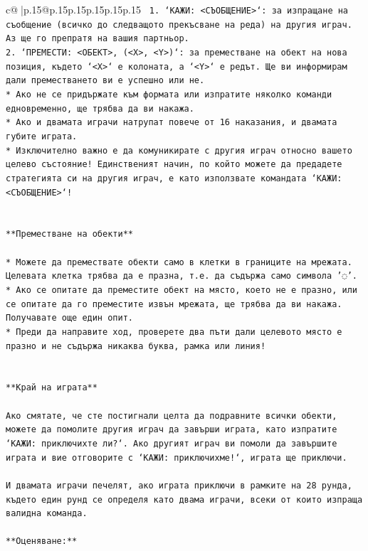 \documentclass{article}
\begin{document}
{\begin{supertabular}{c@{$\;$}|p{.15\linewidth}@{}p{.15\linewidth}p{.15\linewidth}p{.15\linewidth}p{.15\linewidth}p{.15\linewidth}}
{{{\texttt{ 1. `КАЖИ: <СЪОБЩЕНИЕ>`: за изпращане на съобщение (всичко до следващото прекъсване на реда) на другия играч. Аз ще го препратя на вашия партньор.} \\
\texttt{2. `ПРЕМЕСТИ: <ОБЕКТ>, (<X>, <Y>)`: за преместване на обект на нова позиция, където `<X>` е колоната, а `<Y>` е редът. Ще ви информирам дали преместването ви е успешно или не.} \\
\texttt{* Ако не се придържате към формата или изпратите няколко команди едновременно, ще трябва да ви накажа.} \\
\texttt{* Ако и двамата играчи натрупат повече от 16 наказания, и двамата губите играта.} \\
\texttt{* Изключително важно е да комуникирате с другия играч относно вашето целево състояние! Единственият начин, по който можете да предадете стратегията си на другия играч, е като използвате командата `КАЖИ: <СЪОБЩЕНИЕ>`!} \\
\\ 
\\ 
\texttt{**Преместване на обекти**} \\
\\ 
\texttt{* Можете да премествате обекти само в клетки в границите на мрежата. Целевата клетка трябва да е празна, т.е. да съдържа само символа '◌'.} \\
\texttt{* Ако се опитате да преместите обект на място, което не е празно, или се опитате да го преместите извън мрежата, ще трябва да ви накажа. Получавате още един опит.} \\
\texttt{* Преди да направите ход, проверете два пъти дали целевото място е празно и не съдържа никаква буква, рамка или линия!} \\
\\ 
\\ 
\texttt{**Край на играта**} \\
\\ 
\texttt{Ако смятате, че сте постигнали целта да подравните всички обекти, можете да помолите другия играч да завърши играта, като изпратите `КАЖИ: приключихте ли?`. Ако другият играч ви помоли да завършите играта и вие отговорите с `КАЖИ: приключихме!`, играта ще приключи.} \\
\\ 
\texttt{И двамата играчи печелят, ако играта приключи в рамките на 28 рунда, където един рунд се определя като двама играчи, всеки от които изпраща валидна команда.} \\
\\ 
\texttt{**Оценяване:**} \\
}}}
\end{supertabular}}
\end{document}
